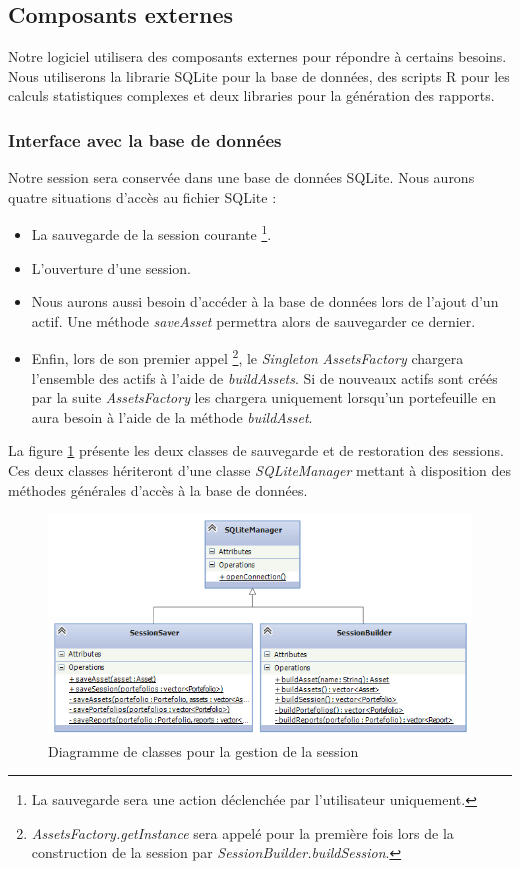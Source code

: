 \documentclass[a4paper,titlepage,french]{report}
\begin{document}
\subsection{Composants externes}

Notre logiciel utilisera des composants externes pour répondre à certains besoins.
Nous utiliserons la librarie SQLite pour la base de données, des scripts R pour les calculs statistiques complexes et deux libraries pour la génération des rapports.

\subsubsection{Interface avec la base de données}

Notre session sera conservée dans une base de données SQLite.
Nous aurons quatre situations d'accès au fichier SQLite :

\begin{itemize}
	\item La sauvegarde de la session courante \footnote{La sauvegarde sera une action déclenchée par l'utilisateur uniquement.}.
  	\item L'ouverture d'une session.
  	\item Nous aurons aussi besoin d'accéder à la base de données lors de l'ajout d'un actif.
	Une méthode \textit{saveAsset} permettra alors de sauvegarder ce dernier.
  	\item Enfin, lors de son premier appel \footnote{\textit{AssetsFactory.getInstance} sera appelé pour la première fois lors de la construction de la session par \textit{SessionBuilder.buildSession}.}, le \textit{Singleton} \textit{AssetsFactory} chargera l'ensemble des actifs à l'aide de \textit{buildAssets}.
	Si de nouveaux actifs sont créés par la suite \textit{AssetsFactory} les chargera uniquement lorsqu'un portefeuille en aura besoin à l'aide de la méthode \textit{buildAsset}.
\end{itemize}

La figure \ref{fig:diagramme-classes-interface-bdd} présente les deux classes de sauvegarde et de restoration des sessions. Ces deux classes hériteront d'une classe \textit{SQLiteManager} mettant à disposition des méthodes générales d'accès à la base de données.

\begin{figure}
  	\center
  	\includegraphics[width=1\textwidth]{diagramme-classes-interface-bdd.png}
  	\caption{Diagramme de classes pour la gestion de la session}
  	\label{fig:diagramme-classes-interface-bdd}
\end{figure}
\end{document}
